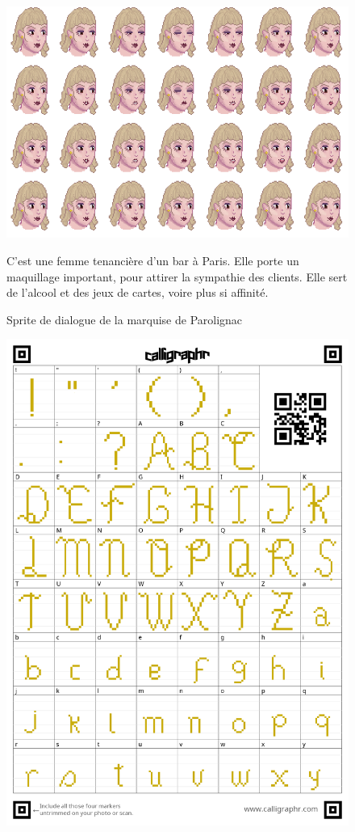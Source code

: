 \documentclass[11pt]{article}
\begin{document}
\begin{appendices}
\begin{figure}[H]
\includegraphics[scale=0.4]{marquiseFaceAnimation}
\centering
\caption{Sprite de dialogue de la marquise de Parolignac}
C'est une femme tenancière d'un bar à Paris. Elle porte un maquillage important, pour attirer la sympathie des clients. Elle sert de l'alcool et des jeux de cartes, voire plus si affinité.
\end{figure}
\begin{figure}[H]
\includegraphics[scale=0.2]{fontPage1}

\end{figure}
\end{appendices}
\end{document}
